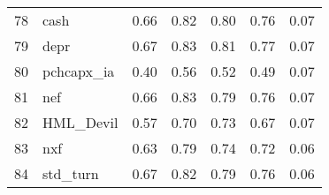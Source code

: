 \documentclass[12pt]{article}
\begin{document}
\begin{footnotesize}
\begin{longtable}{rl|c|c|c|c|c}
78  & cash             & 0.66                                                                                      & 0.82                                                                                        & 0.80                                                                                         & 0.76 & 0.07               \\
79  & depr             & 0.67                                                                                      & 0.83                                                                                        & 0.81                                                                                         & 0.77 & 0.07               \\
80  & pchcapx\_ia      & 0.40                                                                                      & 0.56                                                                                        & 0.52                                                                                         & 0.49 & 0.07               \\
81  & nef              & 0.66                                                                                      & 0.83                                                                                        & 0.79                                                                                         & 0.76 & 0.07               \\
82  & HML\_Devil       & 0.57                                                                                      & 0.70                                                                                        & 0.73                                                                                         & 0.67 & 0.07               \\
83  & nxf              & 0.63                                                                                      & 0.79                                                                                        & 0.74                                                                                         & 0.72 & 0.06               \\
84  & std\_turn        & 0.67                                                                                      & 0.82                                                                                        & 0.79                                                                                         & 0.76 & 0.06               \\

\end{longtable}
\end{footnotesize}
\end{document}
